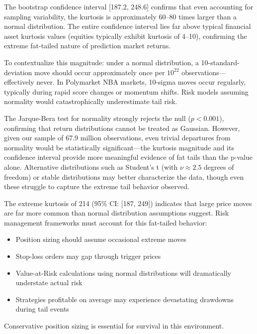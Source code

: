 The bootstrap confidence interval [187.2, 248.6] confirms that even accounting for sampling variability, the kurtosis is approximately 60--80 times larger than a normal distribution. The entire confidence interval lies far above typical financial asset kurtosis values (equities typically exhibit kurtosis of 4--10), confirming the extreme fat-tailed nature of prediction market returns.

To contextualize this magnitude: under a normal distribution, a 10-standard-deviation move should occur approximately once per $10^{22}$ observations---effectively never. In Polymarket NBA markets, 10-sigma moves occur regularly, typically during rapid score changes or momentum shifts. Risk models assuming normality would catastrophically underestimate tail risk.

The Jarque-Bera test for normality strongly rejects the null ($p {<} 0.001$), confirming that return distributions cannot be treated as Gaussian. However, given our sample of 67.9 million observations, even trivial departures from normality would be statistically significant---the kurtosis magnitude and its confidence interval provide more meaningful evidence of fat tails than the p-value alone. Alternative distributions such as Student's t (with $\nu \approx 2.5$ degrees of freedom) or stable distributions may better characterize the data, though even these struggle to capture the extreme tail behavior observed.

\begin{warningbox}
The extreme kurtosis of 214 (95\% CI: [187, 249]) indicates that large price moves are far more common than normal distribution assumptions suggest. Risk management frameworks must account for this fat-tailed behavior:

\begin{itemize}
    \item Position sizing should assume occasional extreme moves
    \item Stop-loss orders may gap through trigger prices
    \item Value-at-Risk calculations using normal distributions will dramatically understate actual risk
    \item Strategies profitable on average may experience devastating drawdowns during tail events
\end{itemize}

Conservative position sizing is essential for survival in this environment.
\end{warningbox}


